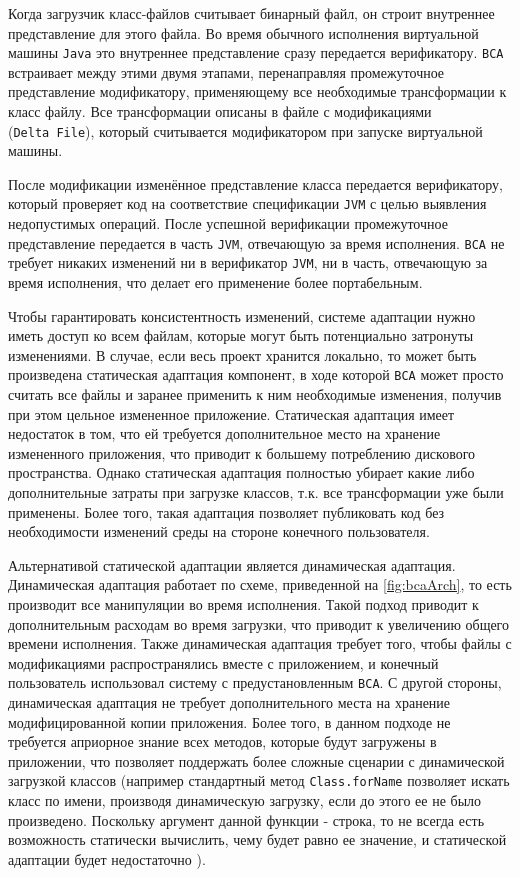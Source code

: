 Когда загрузчик класс-файлов считывает бинарный файл, он строит внутреннее представление для этого файла. Во время обычного исполнения виртуальной машины \texttt{Java} это внутреннее представление сразу передается верификатору. \texttt{BCA} встраивает между этими двумя этапами, перенаправляя промежуточное представление модификатору, применяющему все необходимые трансформации к класс файлу. Все трансформации описаны в файле с модификациями (\texttt{Delta~File}), который считывается модификатором при запуске виртуальной машины. 

После модификации изменённое представление класса передается верификатору, который проверяет код на соответствие спецификации \texttt{JVM} с целью выявления недопустимых операций. После успешной верификации промежуточное представление передается в часть \texttt{JVM}, отвечающую за время исполнения. \texttt{BCA} не требует никаких изменений ни в верификатор \texttt{JVM}, ни в часть, отвечающую за время исполнения, что делает его применение более портабельным.

Чтобы гарантировать консистентность изменений, системе адаптации нужно иметь доступ ко всем файлам, которые могут быть потенциально затронуты изменениями. В случае, если весь проект хранится локально, то может быть произведена статическая адаптация компонент, в ходе которой \texttt{BCA} может просто считать все файлы и заранее применить к ним необходимые изменения, получив при этом цельное измененное приложение. Статическая адаптация имеет недостаток в том, что ей требуется дополнительное место на хранение измененного приложения, что приводит к большему потреблению дискового пространства. Однако статическая адаптация полностью убирает какие либо дополнительные затраты при загрузке классов, т.к. все трансформации уже были применены. Более того, такая адаптация позволяет публиковать код без необходимости изменений среды на стороне конечного пользователя.

Альтернативой статической адаптации является динамическая адаптация. Динамическая адаптация работает по схеме, приведенной на \autoref{fig:bcaArch}, то есть производит все манипуляции во время исполнения. Такой подход приводит к дополнительным расходам во время загрузки, что приводит к увеличению общего времени исполнения. Также динамическая адаптация требует того, чтобы файлы с модификациями распространялись вместе с приложением, и конечный пользователь использовал систему с предустановленным \texttt{BCA}. С другой стороны, динамическая адаптация не требует дополнительного места на хранение модифицированной копии приложения. Более того, в данном подходе не требуется априорное знание всех методов, которые будут загружены в приложении, что позволяет поддержать более сложные сценарии с динамической загрузкой классов (например стандартный метод \texttt{Class.forName} позволяет искать класс по имени, производя динамическую загрузку, если до этого ее не было произведено. Поскольку аргумент данной функции - строка, то не всегда есть возможность статически вычислить, чему будет равно ее значение, и статической адаптации будет недостаточно \cite{bca}).


